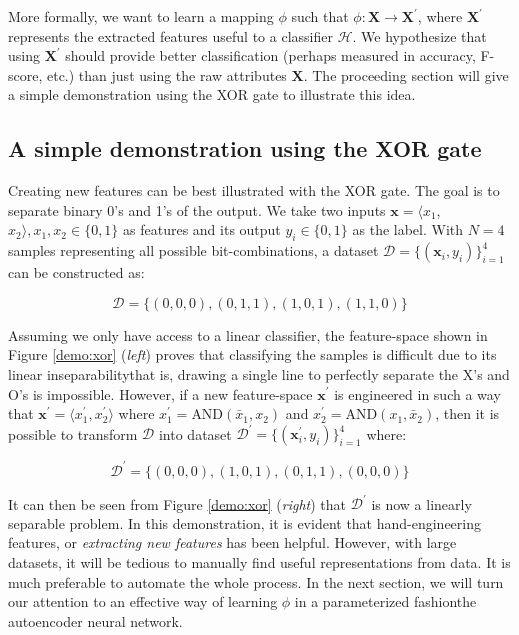 \par More formally, we want to learn a mapping $\phi$ such that $\phi:
\mathbf{X} \rightarrow \mathbf{X}^{\prime}$, where $\mathbf{X}^{\prime}$
represents the extracted features useful to a classifier $\mathcal{H}$. We
hypothesize that using $\mathbf{X}^{\prime}$ should provide better
classification (perhaps measured in accuracy, F-score, etc.) than just using
the raw attributes $\mathbf{X}$. The proceeding section will give a
simple demonstration using the XOR gate to illustrate this idea.

\subsection{A simple demonstration using the XOR gate}

\par Creating new features can be best illustrated with the XOR gate. The
goal is to separate binary 0's and 1's of the output. We take two
inputs $\mathbf{x} = \langle x_{1}$, $x_{2} \rangle, x_1, x_2 \in \{0,1\}$ as
features and its output $y_{i} \in \{0,1\}$ as the label. With $N=4$ samples
representing all possible bit-combinations, a dataset
$\mathcal{D}=\{(\mathbf{x}_{i}, y_{i})\}_{i=1}^{4}$ can be constructed as:

\[
    \mathcal{D} = \{(0,0,0), (0,1,1), (1,0,1), (1,1,0)\}
\]

Assuming we only have access to a linear classifier, the feature-space shown
in Figure \ref{demo:xor} (\textit{left}) proves that classifying the samples
is difficult due to its linear inseparability\textemdash that is, drawing a
single line to perfectly separate the X's and O's is impossible.
However, if a new feature-space $\mathbf{x}^{\prime}$ is engineered in such a
way that $\mathbf{x}^{\prime} = \langle {x}^{\prime}_{1}, {x}^{\prime}_2 \rangle$ where 
$x^{\prime}_{1} = \text{AND}(\bar{x}_{1}, x_{2})$ and $x^{\prime}_{2}
= \text{AND}(x_{1}, \bar{x}_{2})$, then it is possible to transform $\mathcal{D}$
into dataset $\mathcal{D}^{\prime}=\{(\mathbf{x}^{\prime}_{i}, y_{i})\}_{i=1}^{4}$
where:

\[
    \mathcal{D}^{\prime} = \{(0,0,0), (1,0,1), (0,1,1), (0,0,0)\}
\]

\par It can then be seen from Figure \ref{demo:xor} (\textit{right}) that
$\mathcal{D}^{\prime}$ is now a linearly separable problem. In this
demonstration, it is evident that hand-engineering features, or
\textit{extracting new features} has been helpful. However, with large
datasets, it will be tedious to manually find useful representations from
data. It is much preferable to automate the whole process. In the next
section, we will turn our attention to an effective way of learning $\phi$ in
a parameterized fashion\textemdash the autoencoder neural network.

